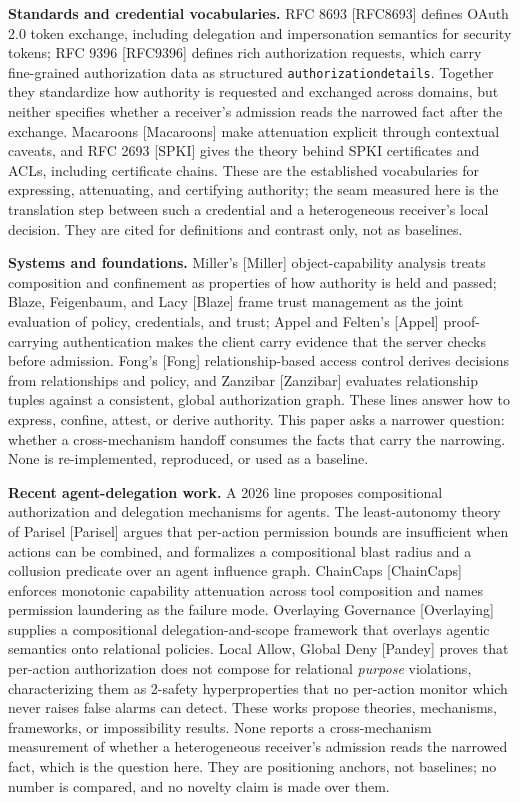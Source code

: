 \documentclass[
  10pt,
]{article}
\let\origtexttt\texttt
\renewcommand{\texttt}[1]{{\upshape\origtexttt{#1}}}
\renewcommand{\_}{\allowbreak\origunderscore}
\begin{document}
\textbf{Standards and credential vocabularies.} RFC 8693 {[}RFC8693{]}
defines OAuth 2.0 token exchange, including delegation and impersonation
semantics for security tokens; RFC 9396 {[}RFC9396{]} defines rich
authorization requests, which carry fine-grained authorization data as
structured \texttt{authorization\_details}. Together they standardize
how authority is requested and exchanged across domains, but neither
specifies whether a receiver's admission reads the narrowed fact after
the exchange. Macaroons {[}Macaroons{]} make attenuation explicit
through contextual caveats, and RFC 2693 {[}SPKI{]} gives the theory
behind SPKI certificates and ACLs, including certificate chains. These
are the established vocabularies for expressing, attenuating, and
certifying authority; the seam measured here is the translation step
between such a credential and a heterogeneous receiver's local decision.
They are cited for definitions and contrast only, not as baselines.

\textbf{Systems and foundations.} Miller's {[}Miller{]}
object-capability analysis treats composition and confinement as
properties of how authority is held and passed; Blaze, Feigenbaum, and
Lacy {[}Blaze{]} frame trust management as the joint evaluation of
policy, credentials, and trust; Appel and Felten's {[}Appel{]}
proof-carrying authentication makes the client carry evidence that the
server checks before admission. Fong's {[}Fong{]} relationship-based
access control derives decisions from relationships and policy, and
Zanzibar {[}Zanzibar{]} evaluates relationship tuples against a
consistent, global authorization graph. These lines answer how to
express, confine, attest, or derive authority. This paper asks a
narrower question: whether a cross-mechanism handoff consumes the facts
that carry the narrowing. None is re-implemented, reproduced, or used as
a baseline.

\textbf{Recent agent-delegation work.} A 2026 line proposes
compositional authorization and delegation mechanisms for agents. The
least-autonomy theory of Parisel {[}Parisel{]} argues that per-action
permission bounds are insufficient when actions can be combined, and
formalizes a compositional blast radius and a collusion predicate over
an agent influence graph. ChainCaps {[}ChainCaps{]} enforces monotonic
capability attenuation across tool composition and names permission
laundering as the failure mode. Overlaying Governance {[}Overlaying{]}
supplies a compositional delegation-and-scope framework that overlays
agentic semantics onto relational policies. Local Allow, Global Deny
{[}Pandey{]} proves that per-action authorization does not compose for
relational \emph{purpose} violations, characterizing them as 2-safety
hyperproperties that no per-action monitor which never raises false
alarms can detect. These works propose theories, mechanisms, frameworks,
or impossibility results. None reports a cross-mechanism measurement of
whether a heterogeneous receiver's admission reads the narrowed fact,
which is the question here. They are positioning anchors, not baselines;
no number is compared, and no novelty claim is made over them.
\end{document}
